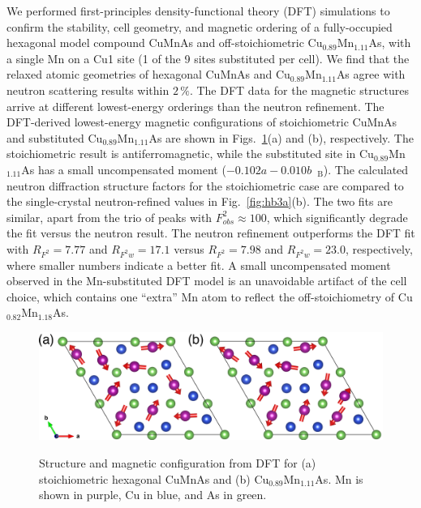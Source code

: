 \documentclass[10pt,doublespacing,edeposit]{uiucthesis2020}
\newcommand*{\cumnas}{Cu$_{0.82}$Mn$_{1.18}$As}
\begin{document}
\begin{mainmatter}
We performed first-principles density-functional theory (DFT) simulations to confirm the stability, cell geometry, and magnetic
ordering of a fully-occupied hexagonal model compound CuMnAs and off-stoichiometric Cu$_{0.89}$Mn$_{1.11}$As, with a single Mn on a Cu1 site (1 of the 9 sites substituted per cell).
We find that the relaxed atomic geometries of hexagonal CuMnAs and Cu$_{0.89}$Mn$_{1.11}$As agree with neutron scattering results within $2\,\%$.
The DFT data for the magnetic structures arrive at different lowest-energy orderings than the neutron refinement. 
The DFT-derived lowest-energy magnetic configurations
of stoichiometric CuMnAs and substituted Cu$_{0.89}$Mn$_{1.11}$As are shown in Figs.\ \ref{fig:DFT-mag}(a) and (b), respectively.
The stoichiometric result is antiferromagnetic, while 
the substituted site in Cu$_{0.89}$Mn$_{1.11}$As has a small uncompensated moment ($-0.102a - 0.010b$~\textmu$_\mathrm{B}$). 
The calculated neutron diffraction structure factors for the stoichiometric case  are compared
to the single-crystal neutron-refined values
in Fig.\ \ref{fig:hb3a}(b). 
The two fits are similar, apart from  the trio of peaks with $F_{obs}^2 \approx 100$,
which significantly degrade the fit versus the neutron result.
The neutron refinement outperforms the DFT fit with $R_{F^2} = 7.77$ and $R_{F^2w} = 17.1$ versus $R_{F^2} = 7.98$ and $R_{F^2w} =23.0$, respectively, where smaller numbers indicate a better fit. 
{\color{black}A small uncompensated moment observed in the Mn-substituted DFT model is an unavoidable artifact of the cell choice, which contains one ``extra'' Mn atom to reflect the off-stoichiometry of \cumnas.}


\begin{figure}
\centering\includegraphics[width=\columnwidth]{figures/ch5/h-cumnas_1x1_dft.png} \\
\caption{\label{fig:DFT-mag}
Structure and magnetic configuration from DFT for (a) stoichiometric hexagonal CuMnAs and (b) Cu$_{0.89}$Mn$_{1.11}$As. 
Mn is shown in purple, Cu in blue, and As in green.
}
\end{figure}



\end{mainmatter}
\end{document}
